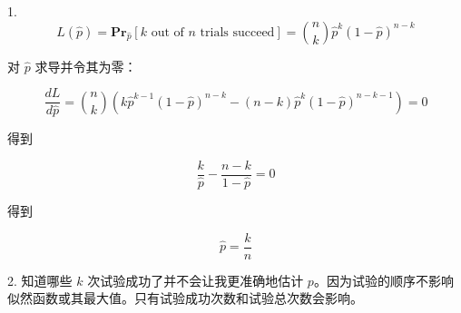 \documentclass[12pt, a4paper, oneside]{ctexart}
\begin{document}
\begin{solution}
  1.
  $$L(\hat{p}) = \mathbf{Pr}_{\hat{p}} [k \text{ out of } n\text{ trials succeed}] = \binom{n}{k} \hat{p}^k (1-\hat{p})^{n-k}$$

  对 $\hat{p}$ 求导并令其为零：

  $$\frac{dL}{d\hat{p}} = \binom{n}{k} (k \hat{p}^{k-1} (1-\hat{p})^{n-k} - (n-k) \hat{p}^k (1-\hat{p})^{n-k-1}) = 0$$

  得到

  $$\frac{k}{\hat{p}} - \frac{n-k}{1-\hat{p}} = 0$$

  得到

  $$\hat{p} = \frac{k}{n}$$


  2.
  知道哪些 $k$ 次试验成功了并不会让我更准确地估计 $p$。因为试验的顺序不影响似然函数或其最大值。只有试验成功次数和试验总次数会影响。

\end{solution}
\end{document}
